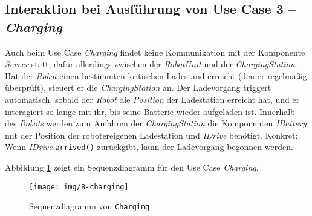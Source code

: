 	\subsection*{Interaktion bei Ausführung von Use Case 3 – \emph{Charging}}
	Auch beim Use Case \emph{Charging} findet keine Kommunikation mit der Komponente \emph{Server} statt, dafür allerdings zwischen der \emph{RobotUnit} und der \emph{ChargingStation}. Hat der \emph{Robot} einen bestimmten kritischen Ladestand erreicht (den er regelmäßig überprüft), steuert er die \emph{ChargingStation} an. Der Ladevorgang triggert automatisch, sobald der \emph{Robot} die \emph{Position} der Ladestation erreicht hat, und er interagiert so lange mit ihr, bis seine Batterie wieder aufgeladen ist. Innerhalb des \emph{Robots} werden zum Anfahren der \emph{ChargingStation} die Komponenten \emph{IBattery} mit der Position der robotereigenen Ladestation und \emph{IDrive} benötigt. Konkret: Wenn \emph{IDrive} \texttt{arrived()} zurückgibt, kann der Ladevorgang begonnen werden.
	
	Abbildung \ref{Charging} zeigt ein Sequenzdiagramm für den Use Case \textit{Charging}.
	
	\begin{figure}[H]
		\centering
		\texttt{[image: img/8-charging]}
		\caption{Sequenzdiagramm von \texttt{Charging}}
		\label{Charging}
	\end{figure}
